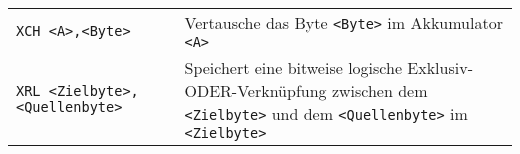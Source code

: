 \begin{longtable}[c]{@{}ll@{}}
\begin{minipage}[t]{0.25\columnwidth}\raggedright\strut
\texttt{XCH\ \textless{}A\textgreater{},\textless{}Byte\textgreater{}}
\strut\end{minipage} &
\begin{minipage}[t]{0.69\columnwidth}\raggedright\strut
Vertausche das Byte \texttt{\textless{}Byte\textgreater{}} im
Akkumulator \texttt{\textless{}A\textgreater{}}
\strut\end{minipage}\tabularnewline
\begin{minipage}[t]{0.25\columnwidth}\raggedright\strut
\texttt{XRL\ \textless{}Zielbyte\textgreater{},}
\texttt{\textless{}Quellenbyte\textgreater{}}
\strut\end{minipage} &
\begin{minipage}[t]{0.69\columnwidth}\raggedright\strut
Speichert eine bitweise logische Exklusiv-ODER-Verknüpfung zwischen dem
\texttt{\textless{}Zielbyte\textgreater{}} und dem
\texttt{\textless{}Quellenbyte\textgreater{}} im
\texttt{\textless{}Zielbyte\textgreater{}}
\strut\end{minipage}\tabularnewline
\bottomrule
\end{longtable}